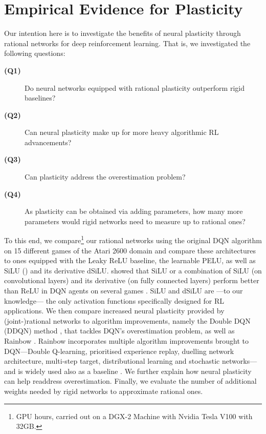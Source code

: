 \documentclass[accepted]{article}
\theoremstyle{plain}
\theoremstyle{definition}
\theoremstyle{remark}
\begin{document}
\section{Empirical Evidence for Plasticity}
\label{sec:Empirical}
Our intention here is to investigate the benefits of neural plasticity through rational networks for deep reinforcement learning. That is, we investigated the following questions: 
\begin{description}
\item[\textbf{(Q1)}] Do neural networks equipped with rational plasticity outperform rigid baselines?
\item[\textbf{(Q2)}] Can neural plasticity make up for more heavy algorithmic RL advancements? 
\item[\textbf{(Q3)}] Can plasticity address the overestimation problem?
\item[\textbf{(Q4)}] As plasticity can be obtained via adding parameters, how many more parameters would rigid networks need to measure up to rational ones? 
\end{description}

To this end, we compare\footnote{ GPU hours, carried out on a DGX-2 Machine with Nvidia Tesla V100 with 32GB.} our rational networks using the original DQN algorithm \citep{mnih2015human} on 15 different games of the Atari 2600 domain \citep{Brockman2016OpenAIG} and compare these architectures to ones equipped with the Leaky ReLU baseline, the learnable PELU, as well as SiLU () and its derivative dSiLU. \citeauthor{elfwing2018sigmoid} showed that SiLU or a combination of SiLU (on convolutional layers) and its derivative (on fully connected layers) perform better than ReLU in DQN agents on several games . SiLU and dSiLU are ---to our knowledge--- the only activation functions specifically designed for RL applications. We then compare increased neural plasticity provided by (joint-)rational networks to algorithm improvements, namely the Double DQN (DDQN) method \citep{van2016deep}, that tackles DQN's overestimation problem, as well as Rainbow \citep{hessel2018rainbow}. Rainbow incorporates multiple algorithm improvements brought to DQN---Double Q-learning, prioritised experience replay, duelling network architecture, multi-step target, distributional learning and stochastic networks---and is widely used also as a baseline \citep{Lin20space, Hafner21discretewm}. We further explain how neural plasticity can help readdress overestimation. Finally, we evaluate the number of additional weights needed by rigid networks to approximate rational ones.
\end{document}
